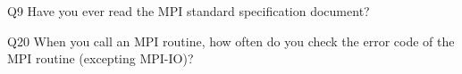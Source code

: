 \begin{description}%
\item{Q9} Have you ever read the MPI standard specification document?%
\item{Q20} When you call an MPI routine, how often do you check the error code of the MPI routine  (excepting MPI-IO)?%
\end{description}%
